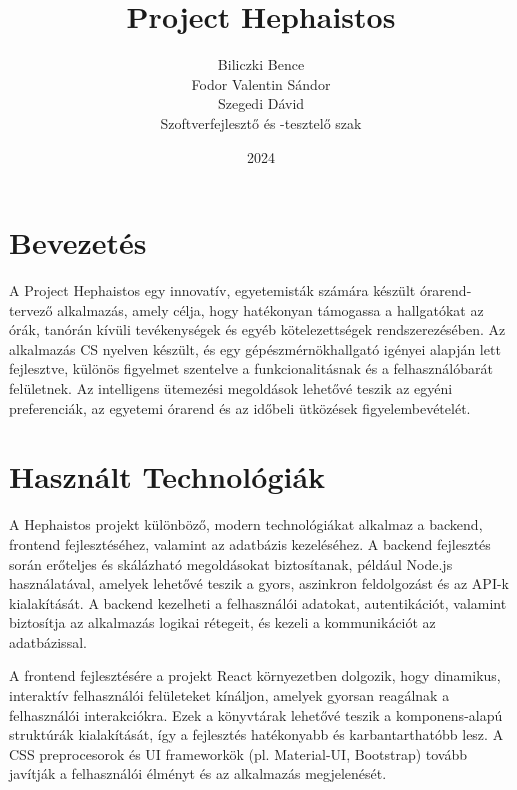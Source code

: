 \documentclass[colorlinks]{thesis-kando}
\theoremstyle{definition}
\theoremstyle{remark}
\begin{document}
\title{Project Hephaistos}

\author{Biliczki Bence\\Fodor Valentin Sándor\\Szegedi Dávid\\Szoftverfejlesztő és -tesztelő szak}

\date{2024}
\begin{figure}[h]
    \centering
    \label{fig:minta}
\end{figure}
\maketitle

\tableofcontents

\pagebreak

\section*{Bevezetés} 

A Project Hephaistos egy innovatív, egyetemisták számára készült órarend-tervező alkalmazás, amely célja, hogy hatékonyan támogassa a hallgatókat az órák, tanórán kívüli tevékenységek és egyéb kötelezettségek rendszerezésében. Az alkalmazás CS nyelven készült, és egy gépészmérnökhallgató igényei alapján lett fejlesztve, különös figyelmet szentelve a funkcionalitásnak és a felhasználóbarát felületnek. Az intelligens ütemezési megoldások lehetővé teszik az egyéni preferenciák, az egyetemi órarend és az időbeli ütközések figyelembevételét.

\section{Használt Technológiák}
A Hephaistos projekt különböző, modern technológiákat alkalmaz a backend, frontend fejlesztéséhez, valamint az adatbázis kezeléséhez. A backend fejlesztés során erőteljes és skálázható megoldásokat biztosítanak, például Node.js használatával, amelyek lehetővé teszik a gyors, aszinkron feldolgozást és az API-k kialakítását. A backend kezelheti a felhasználói adatokat, autentikációt, valamint biztosítja az alkalmazás logikai rétegeit, és kezeli a kommunikációt az adatbázissal.

A frontend fejlesztésére a projekt React környezetben dolgozik, hogy dinamikus, interaktív felhasználói felületeket kínáljon, amelyek gyorsan reagálnak a felhasználói interakciókra. Ezek a könyvtárak lehetővé teszik a komponens-alapú struktúrák kialakítását, így a fejlesztés hatékonyabb és karbantarthatóbb lesz. A CSS preprocesorok és UI frameworkök (pl. Material-UI, Bootstrap) tovább javítják a felhasználói élményt és az alkalmazás megjelenését.
\end{document}
